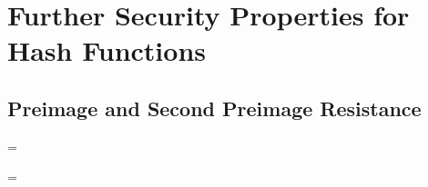 \section{Further Security Properties for Hash Functions}

\subsection{Preimage and Second Preimage Resistance}



\bnm
\AdvOWF{\hash}{\advA} = \Prob{\OWF^\advA_{\hash}\Rightarrow\true}
\enm





\bnm
\AdvSPR{\hash}{\advA} = \Prob{\SPR^\advA_{\hash}\Rightarrow\true}
\enm
